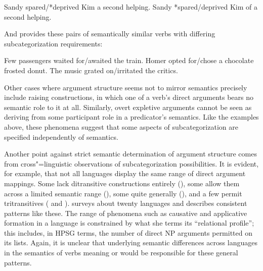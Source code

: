 \documentclass[output=paper
 	        ,biblatex
                ,babelshorthands
                ,newtxmath
                ,draftmode
                ,colorlinks, citecolor=brown
]{langscibook}
\begin{document}
\eal
\ex    Sandy spared/*deprived Kim a second helping.
\ex    Sandy *spared/deprived Kim of a second helping.
\zl

\noindent
And \citet[ex.\ 5.4]{Davis2001} provides these pairs of semantically similar verbs with differing subcategorization requirements:

\eal
\label{ard-subcat-ex}
\ex    Few passengers waited for/awaited the train.
\ex    Homer opted for/chose a chocolate frosted donut.
\ex    The music grated on/irritated the critics.
\zl

\noindent
Other cases where argument structure seems not to mirror semantics precisely include raising
constructions, in which one of a verb's direct arguments bears no semantic role to it at all.
Similarly, overt expletive arguments cannot be seen as deriving from some participant role in a
predicator's semantics.  Like the examples above, these phenomena suggest that some aspects of
subcategorization are specified independently of semantics.

Another point against strict semantic determination of argument structure comes from cross"=linguistic observations of subcategorization possibilities.
It is evident, for example, that not all languages display the same range of direct argument mappings.
Some lack ditransitive constructions entirely (), some allow them across a limited semantic range (), some quite generally (), and a few permit tritransitives ( and ).
\citet{Gerdts1992} surveys about twenty languages and describes consistent patterns like these.
The range of phenomena such as causative and applicative formation in a language is constrained by what she terms its ``relational profile''; this includes, in HPSG terms, the number of direct NP arguments permitted on its \argst lists.
Again, it is unclear that underlying semantic differences across languages in the semantics of verbs meaning  or  would be responsible for these general patterns.%
\end{document}
